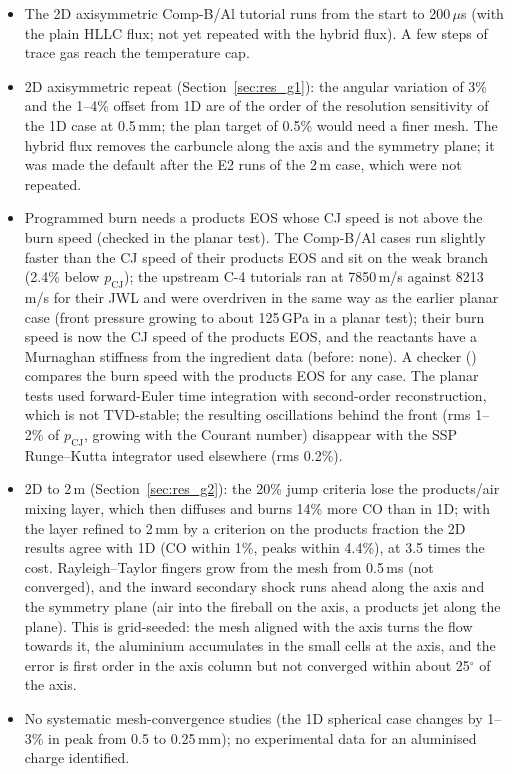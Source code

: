 \documentclass{article}
\begin{document}
\begin{itemize}
    \item The 2D axisymmetric Comp-B/Al tutorial runs from the start to 200\,$\mu$s (with the plain HLLC flux; not yet repeated with the hybrid flux). A few steps of trace gas reach the temperature cap.
    \item 2D axisymmetric repeat (Section~\ref{sec:res_g1}): the angular variation of 3\% and the 1--4\% offset from 1D are of the order of the resolution sensitivity of the 1D case at 0.5\,mm; the plan target of 0.5\% would need a finer mesh. The hybrid flux removes the carbuncle along the axis and the symmetry plane; it was made the default after the E2 runs of the 2\,m case, which were not repeated.
    \item Programmed burn needs a products EOS whose CJ speed is not above the burn speed (checked in the planar test). The Comp-B/Al cases run slightly faster than the CJ speed of their products EOS and sit on the weak branch (2.4\% below $p_\text{CJ}$); the upstream C-4 tutorials ran at 7850\,m/s against 8213\,m/s for their JWL and were overdriven in the same way as the earlier planar case (front pressure growing to about 125\,GPa in a planar test); their burn speed is now the CJ speed of the products EOS, and the reactants have a Murnaghan stiffness from the ingredient data (before: none). A checker () compares the burn speed with the products EOS for any case. The planar tests used forward-Euler time integration with second-order reconstruction, which is not TVD-stable; the resulting oscillations behind the front (rms 1--2\% of $p_\text{CJ}$, growing with the Courant number) disappear with the SSP Runge--Kutta integrator used elsewhere (rms 0.2\%).
    \item 2D to 2\,m (Section~\ref{sec:res_g2}): the 20\% jump criteria lose the products/air mixing layer, which then diffuses and burns 14\% more CO than in 1D; with the layer refined to 2\,mm by a criterion on the products fraction the 2D results agree with 1D (CO within 1\%, peaks within 4.4\%), at 3.5 times the cost. Rayleigh--Taylor fingers grow from the mesh from 0.5\,ms (not converged), and the inward secondary shock runs ahead along the axis and the symmetry plane (air into the fireball on the axis, a products jet along the plane). This is grid-seeded: the mesh aligned with the axis turns the flow towards it, the aluminium accumulates in the small cells at the axis, and the error is first order in the axis column but not converged within about 25$^\circ$ of the axis.
    \item No systematic mesh-convergence studies (the 1D spherical case changes by 1--3\% in peak from 0.5 to 0.25\,mm); no experimental data for an aluminised charge identified.
\end{itemize}
\end{document}
